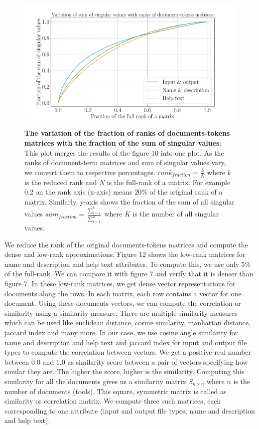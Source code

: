 \begin{figure}[h]
\begin{centering}
    {\includegraphics[scale=0.45]{figures/Fraction_ranks_singular_values.pdf}}
    \caption[The variation of the fraction of ranks of documents-tokens matrices with the fraction of the sum of singular values]{\textbf{The variation of the fraction of ranks of documents-tokens matrices with the fraction of the sum of singular values}: This plot merges the results of the figure 10 into one plot. As the ranks of document-term matrices and sum of singular values vary, we convert them to respective percentages. $rank_{fraction} = \frac{k}{N}$ where $k$ is the reduced rank and $N$ is the full-rank of a matrix. For example $0.2$ on the rank axis (x-axis) means $20\%$ of the original rank of a matrix. Similarly, y-axis shows the fraction of the sum of all singular values $ sum_{fraction} = \frac{\sum_{i=1}^k}{\sum_{i=1}^K}$ where $K$ is the number of all singular values.}
\end{centering}
\end{figure}

We reduce the rank of the original documents-tokens matrices and compute the dense and low-rank approximations. Figure 12 shows the low-rank matrices for name and description and help text attributes. To compute this, we use only $5\%$ of the full-rank. We can compare it with figure 7 and verify that it is denser than figure 7. In these low-rank matrices, we get dense vector representations for documents along the rows. In each matrix, each row contains a vector for one document. Using these documents vectors, we can compute the correlation or similarity using a similarity measure. There are multiple similarity measures which can be used like euclidean distance, cosine similarity, manhattan distance, jaccard index and many more. In our case, we use cosine angle similarity for name and description and help text and jaccard index for input and output file types to compute the correlation between vectors. We get a positive real number between $0.0$ and $1.0$ as similarity score between a pair of vectors specifying how similar they are. The higher the score, higher is the similarity. Computing this similarity for all the documents gives us a similarity matrix $S_{n \times n}$ where $n$ is the number of documents (tools). This square, symmetric matrix is called as similarity or correlation matrix. We compute three such matrices, each corresponding to one attribute (input and output file types, name and description and help text).
  
